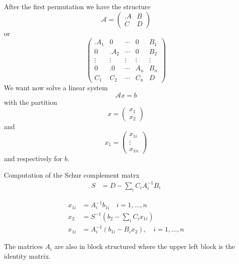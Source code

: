 \documentclass[12pt,a4paper]{article}
\begin{document}
	After the first permutation we have the structure
	$$
	\mathcal{A} =
	\begin{pmatrix}
		.A & B \\
		C & D
	\end{pmatrix}
	$$
	or
	$$
	\begin{pmatrix}
		.A_{1} & 0 & \cdots & 0 & B_{1} \\
		0 & .A_{2}  &  \cdots & 0 & B_{2} \\
		\vdots & \vdots &  \vdots  &  \vdots  &  \vdots \\
		0 & .0  &  \cdots & A_{n} & B_{n} \\
		C_1 & C_2 & \cdots  & C_{n} & D
	\end{pmatrix}
	$$
	We want now solve a linear system
	$$
		\mathcal{A} 	x = b
	$$
	with the partition 
	$$
	x = 
	\begin{pmatrix}
		x_1 \\
		x_2
	\end{pmatrix}
	$$ 
	and
	$$
	x_1=
	\begin{pmatrix}
		x_{1i} \\
		\vdots \\
		x_{1n}
	\end{pmatrix}
	$$ 
	and respectively for $b$.
	
	Computation of the Schur complement matrx 
	\begin{align*}
		S& = D - \sum_i C_iA_i^{-1}B_i
	\end{align*}
	
	\begin{align*}
		x_{1i}  & = A_i^{-1}b_{1i} \quad i=1,\ldots,n\\
		x_2 & = S^{-1}(b_2-\sum_i C_ix_{1i})\\
		x_{1i} & = A_i^{-1}(b_{1i}-B_ix_2), \quad i=1,\ldots,n
	\end{align*}
	
	The matrices $A_i$ are also in block structured where the upper left block is the identity matrix.
	
\end{document}
